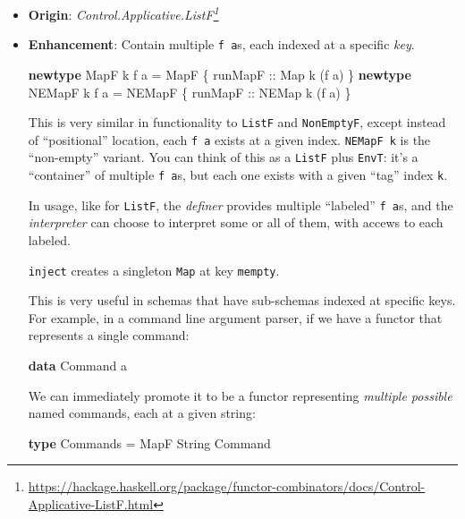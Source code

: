 \documentclass[]{article}
\newenvironment{Shaded}{}{}
\newcommand{\DataTypeTok}[1]{\textcolor[rgb]{0.56,0.13,0.00}{#1}}
\newcommand{\KeywordTok}[1]{\textcolor[rgb]{0.00,0.44,0.13}{\textbf{#1}}}
\newcommand{\NormalTok}[1]{#1}
\newcommand{\OtherTok}[1]{\textcolor[rgb]{0.00,0.44,0.13}{#1}}
\renewcommand{\href}[2]{#2\footnote{\url{#1}}}
\begin{document}
\begin{itemize}
\item
  \textbf{Origin}:
  \emph{\href{https://hackage.haskell.org/package/functor-combinators/docs/Control-Applicative-ListF.html}{Control.Applicative.ListF}}
\item
  \textbf{Enhancement}: Contain multiple \texttt{f\ a}s, each indexed at a
  specific \emph{key}.

\begin{Shaded}
\begin{Highlighting}[]
\KeywordTok{newtype} \DataTypeTok{MapF}\NormalTok{   k f a }\OtherTok{=} \DataTypeTok{MapF}\NormalTok{   \{}\OtherTok{ runMapF ::} \DataTypeTok{Map}\NormalTok{   k (f a) \}}
\KeywordTok{newtype} \DataTypeTok{NEMapF}\NormalTok{ k f a }\OtherTok{=} \DataTypeTok{NEMapF}\NormalTok{ \{}\OtherTok{ runMapF ::} \DataTypeTok{NEMap}\NormalTok{ k (f a) \}}
\end{Highlighting}
\end{Shaded}

  This is very similar in functionality to \texttt{ListF} and
  \texttt{NonEmptyF}, except instead of ``positional'' location, each
  \texttt{f\ a} exists at a given index. \texttt{NEMapF\ k} is the ``non-empty''
  variant. You can think of this as a \texttt{ListF} plus \texttt{EnvT}: it's a
  ``container'' of multiple \texttt{f\ a}s, but each one exists with a given
  ``tag'' index \texttt{k}.

  In usage, like for \texttt{ListF}, the \emph{definer} provides multiple
  ``labeled'' \texttt{f\ a}s, and the \emph{interpreter} can choose to interpret
  some or all of them, with accews to each labeled.

  \texttt{inject} creates a singleton \texttt{Map} at key \texttt{mempty}.

  This is very useful in schemas that have sub-schemas indexed at specific keys.
  For example, in a command line argument parser, if we have a functor that
  represents a single command:

\begin{Shaded}
\begin{Highlighting}[]
\KeywordTok{data} \DataTypeTok{Command}\NormalTok{ a}
\end{Highlighting}
\end{Shaded}

  We can immediately promote it to be a functor representing \emph{multiple
  possible} named commands, each at a given string:

\begin{Shaded}
\begin{Highlighting}[]
\KeywordTok{type} \DataTypeTok{Commands} \OtherTok{=} \DataTypeTok{MapF} \DataTypeTok{String} \DataTypeTok{Command}
\end{Highlighting}
\end{Shaded}


\end{itemize}
\end{document}

